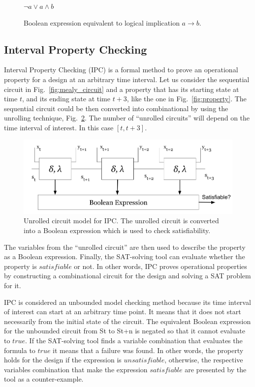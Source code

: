 \begin{figure}[htb!]
    \begin{center}
        $\neg a \lor a \land b$
    \end{center}
    \caption{Boolean expression equivalent to logical implication $a \longrightarrow b$.}
    \label{fig:not_a_or_a_and_b}
\end{figure}

\subsection{Interval Property Checking}
\label{subsection:ipc}

Interval Property Checking (IPC) is a formal method to prove an operational property for a design at an arbitrary time interval. Let us consider the sequential circuit in Fig.~\ref{fig:mealy_circuit} and a property that has its starting state at time $t$, and its ending state at time $t+3$, like the one in Fig.~\ref{fig:property}. The sequential circuit could be then converted into combinational by using the unrolling technique, Fig.~\ref{fig:unrolled}. The number of “unrolled circuits” will depend on the time interval of interest. In this case $[t, t+3]$.

\begin{figure}[htb!]
	\centering
	\includegraphics[width=\textwidth]{images/unrolled_circuit.png}
	\caption{Unrolled circuit model for IPC. The unrolled circuit is converted into a Boolean expression which is used to check satisfiability.}
	\label{fig:unrolled}
\end{figure}

The variables from the “unrolled circuit” are then used to describe the property as a Boolean expression. Finally, the SAT-solving tool can evaluate whether the property is $satisfiable$ or not. In other words, IPC proves operational properties by constructing a combinational circuit for the design and solving a SAT problem for it. 

IPC is considered an unbounded model checking method because its time interval of interest can start at an arbitrary time point. It means that it does not start necessarily from the initial state of the circuit. The equivalent Boolean expression for the unbounded circuit from St to St+n is negated so that it cannot evaluate to $true$. If the SAT-solving tool finds a variable combination that evaluates the formula to $true$ it means that a failure was found. In other words, the property holds for the design if the expression is $unsatisfiable$, otherwise, the respective variables combination that make the expression $satisfiable$ are presented by the tool as a counter-example.

